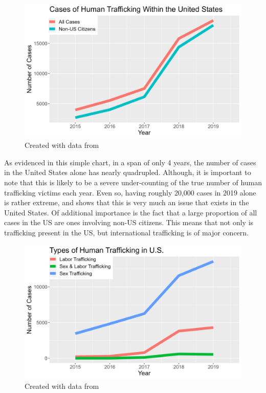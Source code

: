 \documentclass{article} %
\begin{document}
\FloatBarrier

\begin{figure}[H]
	\includegraphics[width = \textwidth]{USTrafficking}
	\scriptsize{\caption{Created with data from \cite{CTDC}}}
\end{figure}

\FloatBarrier

As evidenced in this simple chart, in a span of only 4 years, the number of cases in the United States alone has nearly quadrupled. Although, it is important to note that this is likely to be a severe under-counting of the true number of human trafficking victims each year. Even so, having roughly 20,000 cases in 2019 alone is rather extreme, and shows that this is very much an issue that exists in the United States. Of additional importance is the fact that a large proportion of all cases in the US are ones involving non-US citizens. This means that not only is trafficking present in the US, but international trafficking is of major concern.

\FloatBarrier

\begin{figure}[H]
	\includegraphics[width = \textwidth]{USTrafficking2}
	\scriptsize{\caption{Created with data from \cite{CTDC}}}
\end{figure}
\end{document}
